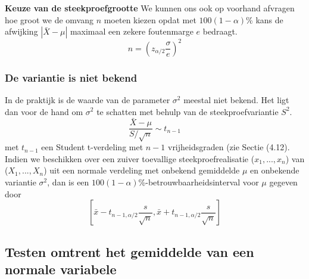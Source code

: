 \documentclass[titlepage]{article}
\numberwithin{equation}{section}
\begin{document}
\textbf{Keuze van de steekproefgrootte} \newline\newline
We kunnen ons ook op voorhand afvragen hoe groot we de omvang $n$ moeten kiezen opdat met $100(1-\alpha)$\% kans de afwijking $|\bar{X}-\mu |$ maximaal een zekere foutenmarge $e$ bedraagt.
\begin{equation}
	n = \left( z_{\alpha/2}\frac{\sigma}{e}\right)^2
	\label{6.7}
\end{equation}
\subsubsection{De variantie is niet bekend}
In de praktijk is de waarde van de parameter $\sigma^2$ meestal niet bekend. Het ligt dan voor de hand om $\sigma^2$ te schatten met behulp van de steekproefvariantie $S^2$.
\begin{equation}
	\frac{\bar{X} - \mu}{S/\sqrt{n}} \sim t_{n-1}
	\label{6.8}
\end{equation}
met $t_{n-1}$ een Student t-verdeling met $n-1$ vrijheidsgraden (zie Sectie (4.12).\newline\newline
Indien we beschikken over een zuiver toevallige steekproefrealisatie ($x_1, ... , x_n$) van ($X_1, ... , X_n$) uit een normale verdeling met onbekend gemiddelde $\mu$ en onbekende variantie $\sigma^2$, dan is een $100(1-\alpha)$\%-betrouwbaarheidsinterval voor $\mu$ gegeven door
\begin{equation}
	\left[ \bar{x}-t_{n-1,\alpha/2}\frac{s}{\sqrt{n}}, \bar{x} + t_{n-1,\alpha/2} \frac{s}{\sqrt{n}} \right]
	\label{6.9}
\end{equation}
\subsection{Testen omtrent het gemiddelde van een normale variabele}
\end{document}
